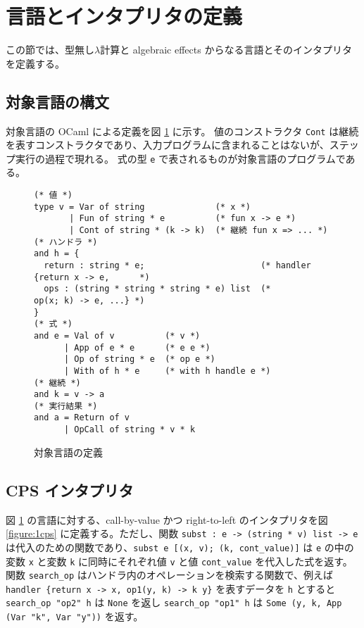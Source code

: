 \section{言語とインタプリタの定義}
\label{section:definition}

この節では、型無し$\lambda$計算と algebraic effects からなる言語とそのインタプリタを定義する。

\subsection{対象言語の構文}
\label{subsection:syntax}

対象言語の OCaml による定義を図 \ref{figure:syntax} に示す。
値のコンストラクタ \texttt{Cont} は継続を表すコンストラクタであり、入力プログラムに含まれることはないが、ステップ実行の過程で現れる。
式の型 \texttt{e} で表されるものが対象言語のプログラムである。

\begin{figure}
\begin{verbatim}
(* 値 *)
type v = Var of string              (* x *)
       | Fun of string * e          (* fun x -> e *)
       | Cont of string * (k -> k)  (* 継続 fun x => ... *)
(* ハンドラ *)
and h = {
  return : string * e;                       (* handler {return x -> e,      *)
  ops : (string * string * string * e) list  (*          op(x; k) -> e, ...} *)
}
(* 式 *)
and e = Val of v          (* v *)
      | App of e * e      (* e e *)
      | Op of string * e  (* op e *)
      | With of h * e     (* with h handle e *)
(* 継続 *)
and k = v -> a
(* 実行結果 *)
and a = Return of v
      | OpCall of string * v * k

\end{verbatim}
\caption{対象言語の定義}
\label{figure:syntax}
\end{figure}

\subsection{CPS インタプリタ}

図 \ref{figure:syntax} の言語に対する、call-by-value かつ right-to-left のインタプリタを図 \ref{figure:1cps} に定義する。ただし、関数 \texttt{subst : e -> (string * v) list -> e} は代入のための関数であり、\texttt{subst e [(x, v); (k, cont\_value)]} は \texttt{e} の中の変数 \texttt{x} と変数 \texttt{k} に同時にそれぞれ値 \texttt{v} と値 \texttt{cont\_value} を代入した式を返す。関数 \texttt{search\_op} はハンドラ内のオペレーションを検索する関数で、例えば \texttt{handler \{return x -> x, op1(y, k) -> k y\}} を表すデータを \texttt{h} とすると \texttt{search\_op "op2" h} は \texttt{None} を返し \texttt{search\_op "op1" h} は \texttt{Some (y, k, App (Var "k", Var "y"))} を返す。

